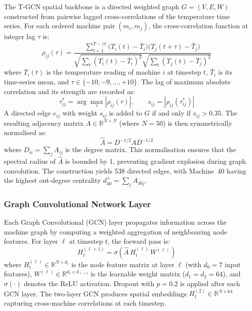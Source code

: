 The T-GCN spatial backbone is a directed weighted graph $G = (V, E, W)$ constructed from pairwise lagged cross-correlations of the temperature time series. For each ordered machine pair $(m_i, m_j)$, the cross-correlation function at integer lag $\tau$ is:
\begin{equation}
    \rho_{ij}(\tau) = \frac{\sum_{t=1}^{T-|\tau|} \bigl(T_i(t) - \bar{T}_i\bigr)\bigl(T_j(t+\tau) - \bar{T}_j\bigr)}
    {\sqrt{\sum_{t}(T_i(t)-\bar{T}_i)^2}\sqrt{\sum_{t}(T_j(t)-\bar{T}_j)^2}}
    \label{eq:xcorr}
\end{equation}
where $T_i(t)$ is the temperature reading of machine $i$ at timestep $t$, $\bar{T}_i$ is its time-series mean, and $\tau \in \{-10, -9, \ldots, +10\}$. The lag of maximum absolute correlation and its strength are recorded as:
\begin{equation}
    \tau^*_{ij} = \arg\max_{\tau} |\rho_{ij}(\tau)|, \qquad
    s_{ij} = |\rho_{ij}(\tau^*_{ij})|
    \label{eq:best_lag}
\end{equation}
A directed edge $e_{ij}$ with weight $s_{ij}$ is added to $G$ if and only if $s_{ij} > 0.35$. The resulting adjacency matrix $A \in \mathbb{R}^{N \times N}$ (where $N = 50$) is then symmetrically normalised as:
\begin{equation}
    \hat{A} = D^{-1/2} A D^{-1/2}
    \label{eq:norm_adj}
\end{equation}
where $D_{ii} = \sum_j A_{ij}$ is the degree matrix. This normalisation ensures that the spectral radius of $\hat{A}$ is bounded by 1, preventing gradient explosion during graph convolution. The construction yields 538 directed edges, with Machine~40 having the highest out-degree centrality $d^+_{40} = \sum_j A_{40j}$.

\subsubsection{Graph Convolutional Network Layer}

Each Graph Convolutional (GCN) layer propagates information across the machine graph by computing a weighted aggregation of neighbouring node features. For layer $\ell$ at timestep $t$, the forward pass is:
\begin{equation}
    H^{(\ell+1)}_t = \sigma\!\left(\hat{A}\, H^{(\ell)}_t\, W^{(\ell)}\right)
    \label{eq:gcn}
\end{equation}
where $H^{(\ell)}_t \in \mathbb{R}^{N \times d_\ell}$ is the node feature matrix at layer $\ell$ (with $d_0 = 7$ input features), $W^{(\ell)} \in \mathbb{R}^{d_\ell \times d_{\ell+1}}$ is the learnable weight matrix ($d_1 = d_2 = 64$), and $\sigma(\cdot)$ denotes the ReLU activation. Dropout with $p = 0.2$ is applied after each GCN layer. The two-layer GCN produces spatial embeddings $H^{(2)}_t \in \mathbb{R}^{N \times 64}$ capturing cross-machine correlations at each timestep.

